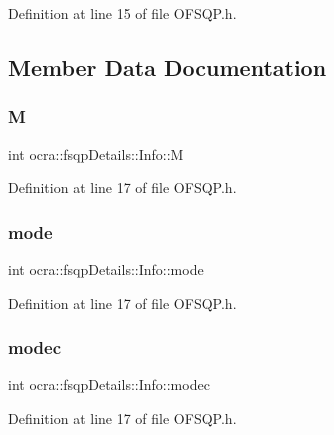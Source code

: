 Definition at line 15 of file O\+F\+S\+Q\+P.\+h.



\subsection{Member Data Documentation}
\hypertarget{structocra_1_1fsqpDetails_1_1Info_af5d1d58f36a31a7f870b0d8cefcc538d}{}\label{structocra_1_1fsqpDetails_1_1Info_af5d1d58f36a31a7f870b0d8cefcc538d} 
\subsubsection{\texorpdfstring{M}{M}}
{\footnotesize\ttfamily int ocra\+::fsqp\+Details\+::\+Info\+::M}



Definition at line 17 of file O\+F\+S\+Q\+P.\+h.

\hypertarget{structocra_1_1fsqpDetails_1_1Info_a67a52237ba860d5bc9d28240d454d8a0}{}\label{structocra_1_1fsqpDetails_1_1Info_a67a52237ba860d5bc9d28240d454d8a0} 
\subsubsection{\texorpdfstring{mode}{mode}}
{\footnotesize\ttfamily int ocra\+::fsqp\+Details\+::\+Info\+::mode}



Definition at line 17 of file O\+F\+S\+Q\+P.\+h.

\hypertarget{structocra_1_1fsqpDetails_1_1Info_a62dcde0a7a324e41c4a6aa12ae7b7c8b}{}\label{structocra_1_1fsqpDetails_1_1Info_a62dcde0a7a324e41c4a6aa12ae7b7c8b} 
\subsubsection{\texorpdfstring{modec}{modec}}
{\footnotesize\ttfamily int ocra\+::fsqp\+Details\+::\+Info\+::modec}



Definition at line 17 of file O\+F\+S\+Q\+P.\+h.

